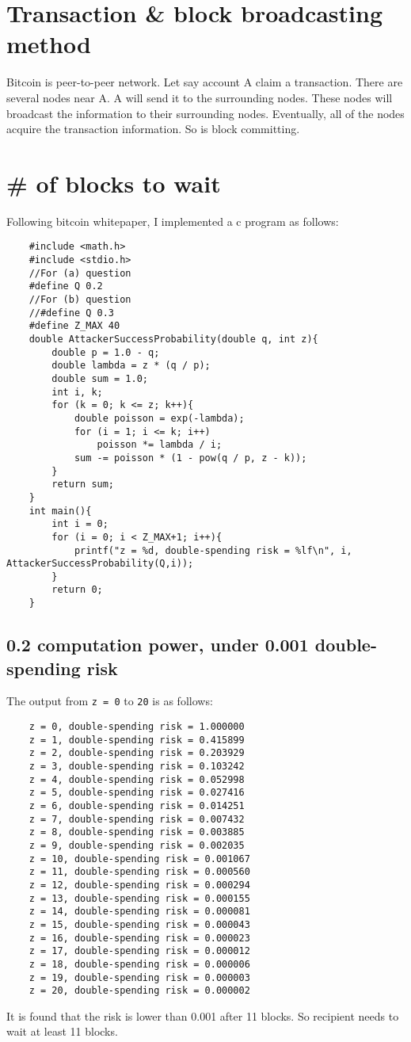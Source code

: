 \documentclass{article}
\begin{document}
\section{Transaction \& block broadcasting method}
Bitcoin is peer-to-peer network. Let say account A claim a transaction. There are several nodes near A. A will send it to the surrounding nodes. These nodes will broadcast the information to their surrounding nodes. Eventually, all of the nodes acquire the transaction information. So is block committing.
\section{\# of blocks to wait}
Following bitcoin whitepaper, I implemented a c program as follows:
\begin{verbatim}
    #include <math.h>
    #include <stdio.h>
    //For (a) question
    #define Q 0.2
    //For (b) question
    //#define Q 0.3
    #define Z_MAX 40
    double AttackerSuccessProbability(double q, int z){
        double p = 1.0 - q;
        double lambda = z * (q / p);
        double sum = 1.0;
        int i, k;
        for (k = 0; k <= z; k++){
            double poisson = exp(-lambda);
            for (i = 1; i <= k; i++)
                poisson *= lambda / i;
            sum -= poisson * (1 - pow(q / p, z - k));
        }
        return sum; 
    }
    int main(){
        int i = 0;
        for (i = 0; i < Z_MAX+1; i++){
            printf("z = %d, double-spending risk = %lf\n", i, AttackerSuccessProbability(Q,i));
        }
        return 0;
    }
\end{verbatim}
\subsection{0.2 computation power, under 0.001 double-spending risk}
The output from \verb|z = 0| to \verb|20| is as follows:\\
\begin{verbatim}
    z = 0, double-spending risk = 1.000000
    z = 1, double-spending risk = 0.415899
    z = 2, double-spending risk = 0.203929
    z = 3, double-spending risk = 0.103242
    z = 4, double-spending risk = 0.052998
    z = 5, double-spending risk = 0.027416
    z = 6, double-spending risk = 0.014251
    z = 7, double-spending risk = 0.007432
    z = 8, double-spending risk = 0.003885
    z = 9, double-spending risk = 0.002035
    z = 10, double-spending risk = 0.001067
    z = 11, double-spending risk = 0.000560
    z = 12, double-spending risk = 0.000294
    z = 13, double-spending risk = 0.000155
    z = 14, double-spending risk = 0.000081
    z = 15, double-spending risk = 0.000043
    z = 16, double-spending risk = 0.000023
    z = 17, double-spending risk = 0.000012
    z = 18, double-spending risk = 0.000006
    z = 19, double-spending risk = 0.000003
    z = 20, double-spending risk = 0.000002
\end{verbatim}
It is found that the risk is lower than 0.001 after 11 blocks. So recipient needs to wait at least 11 blocks.
\end{document}
